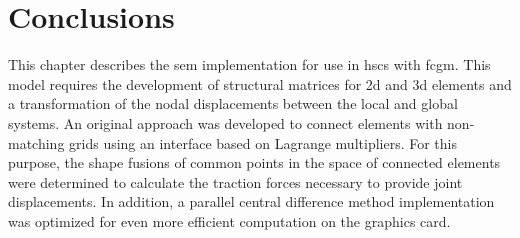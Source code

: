 \section{Conclusions}
\label{sec:conclusionsSEM}
This chapter describes the \ac{sem} implementation for use in \acp{hsc} with \ac{fcgm}.
This model requires the development of structural matrices for \ac{2d} and \ac{3d} elements and a transformation of the nodal displacements between the local and global systems.
An original approach was developed to connect elements with non-matching grids using an interface based on Lagrange multipliers.
For this purpose, the shape fusions of common points in the space of connected elements were determined to calculate the traction forces necessary to provide joint displacements.
In addition, a parallel central difference method implementation was optimized for even more efficient computation on the graphics card.

